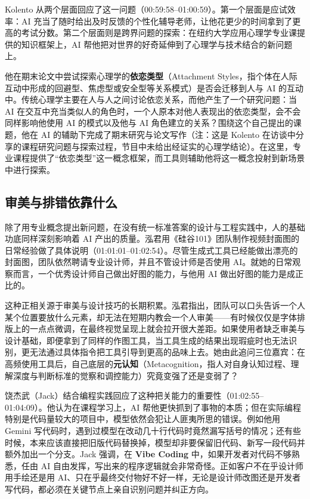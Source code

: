 \documentclass[UTF8,a4paper,11pt,fontset=fandol]{ctexart}
\begin{document}
Kolento 从两个层面回应了这一问题（00:59:58–01:00:59）。第一个层面是应试效率：AI 充当了随时给出及时反馈的个性化辅导老师，让他花更少的时间拿到了更高的考试分数。第二个层面则是跨界问题的探索：在纽约大学应用心理学专业课提供的知识框架上，AI 帮他把对世界的好奇延伸到了心理学与技术结合的新问题上。

他在期末论文中尝试探索心理学的\textbf{依恋类型}（Attachment Styles，指个体在人际互动中形成的回避型、焦虑型或安全型等关系模式）是否会迁移到人与 AI 的互动中。传统心理学主要在人与人之间讨论依恋关系，而他产生了一个研究问题：当 AI 在交互中充当类似人的角色时，一个人原本对他人表现出的依恋类型，会不会同样影响他使用 AI 的模式以及他与 AI 角色建立的关系？围绕这个自己提出的课题，他在 AI 的辅助下完成了期末研究与论文写作（注：这是 Kolento 在访谈中分享的课程研究问题与探索过程，节目中未给出经证实的心理学结论）。在这里，专业课程提供了“依恋类型”这一概念框架，而工具则辅助他将这一概念投射到新场景中进行探索。

\subsection{审美与排错依靠什么}
除了用专业概念提出新问题，在没有统一标准答案的设计与工程实践中，人的基础功底同样深刻影响着 AI 产出的质量。泓君用《硅谷101》团队制作视频封面图的日常经验做了具体说明（01:01:01–01:02:54）。尽管生成式工具已经能做出漂亮的封面图，团队依然聘请专业设计师，并且不管设计师是否使用 AI。就她的日常观察而言，一个优秀设计师自己做出好图的能力，与他用 AI 做出好图的能力是成正比的。

这种正相关源于审美与设计技巧的长期积累。泓君指出，团队可以口头告诉一个人某个位置要放什么元素，却无法在短期内教会一个人审美——有时候仅仅是字体排版上的一点点微调，在最终视觉呈现上就会拉开很大差距。如果使用者缺乏审美与设计基础，即便拿到了同样的作图工具，当工具生成的结果出现瑕疵时也无法识别，更无法通过具体指令把工具引导到更高的品味上去。她由此追问三位嘉宾：在高频使用工具后，自己底层的\textbf{元认知}（Metacognition，指人对自身认知过程、理解深度与判断标准的觉察和调控能力）究竟变强了还是变弱了？

饶杰武（Jack）结合编程实践回应了这种把关能力的重要性（01:02:55–01:04:09）。他认为在课程学习上，AI 帮他更快抓到了事物的本质；但在实际编程特别是代码量较大的项目中，模型依然会犯让人匪夷所思的错误。例如他用 Gemini 写代码时，遇到过模型在改动几十行代码时竟然漏写括号的情况；还有些时候，本来应该直接把旧版代码替换掉，模型却非要保留旧代码、新写一段代码并额外加出一个分支。Jack 强调，在 \textbf{Vibe Coding} 中，如果开发者对代码不够熟悉，任由 AI 自由发挥，写出来的程序逻辑就会非常奇怪。正如客户不在乎设计师用手绘还是用 AI、只在乎最终交付物好不好一样，无论是设计师改图还是开发者写代码，都必须在关键节点上亲自识别问题并纠正方向。
\end{document}

